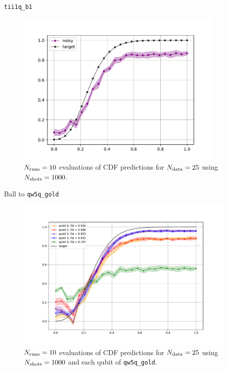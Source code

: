 \documentclass[8pt, xcolor={svgnames}, hyperref={colorlinks, linkcolor=black, citecolor=amethyst, urlcolor=amethyst}]{beamer}
\begin{document}
\begin{frame}{\texttt{tii1q\_b1} \hfill \faCogs}
\begin{figure}
    \includegraphics[width=0.9\textwidth]{figures/mit_report_1q.pdf}
    \caption{$N_{\rm runs}=10$ evaluations of CDF predictions for $N_{\rm data}=25$ 
    using $N_{\rm shots}=1000$.}
\end{figure}
\end{frame}

\begin{frame}{Ball to \texttt{qw5q\_gold} \hfill \faCogs}
\begin{figure}
    \includegraphics[width=0.95\textwidth]{figures/5q_hardware.pdf}
    \caption{$N_{\rm runs}=10$ evaluations of CDF predictions for $N_{\rm data}=25$ 
    using $N_{\rm shots}=1000$ and each qubit of \texttt{qw5q\_gold}.}
\end{figure}
\end{frame}
\end{document}
